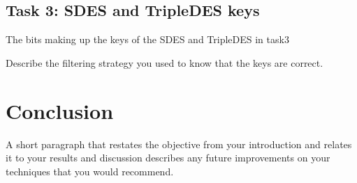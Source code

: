 \documentclass[a4paper,english,12pt]{article}
\begin{document}
\subsection{Task 3: SDES and TripleDES keys}
The bits making up the keys of the SDES and TripleDES in task3

Describe the filtering strategy you used to know that the keys are correct.

\section{Conclusion}

A short paragraph that restates the objective from your introduction and
relates it to your results and discussion describes any future improvements on
your techniques that you would recommend.



\end{document}
